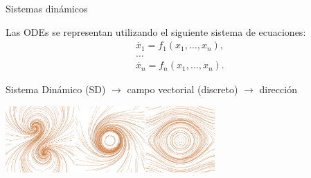 \documentclass[spanish,unknownkeysallowed,10pt]{beamer}
\begin{document}
\begin{frame}{Sistemas dinámicos}

Las ODEs se representan utilizando el siguiente sistema de ecuaciones:
\begin{equation*}
  \begin{aligned}
    \dot{x_{1}} = f_{1}(x_{1},\ldots,x_{n}),\\
    \ldots\\
    \dot{x_{n}} = f_{n}(x_{1},\ldots,x_{n}).
  \end{aligned}
\end{equation*}






\vspace{0.1cm}

Sistema Dinámico (SD) $\rightarrow$ campo vectorial (discreto) $\rightarrow$ dirección



  \centerline{\includegraphics[width=8cm]{../figures/Fig2}}



\end{frame}
\end{document}
